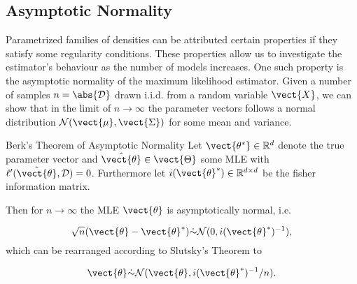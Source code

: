     \subsection{Asymptotic Normality}
        \label{ssec:asymp}
        Parametrized families of densities can be attributed certain properties if they satisfy some regularity conditions.
        These properties allow us to investigate the estimator's behaviour as the number of models increases. 
        One such property is the asymptotic normality of the maximum likelihood estimator.
        Given a number of samples $n = \abs{\mathcal{D}}$ drawn i.i.d. from a random variable $\vect{X}$, we can show that in the limit of $n \rightarrow \infty$ the parameter vectors follows a normal distribution $\mathcal{N}(\vect{\mu}, \vect{\Sigma})$ for some mean and variance.


        \begin{threm}{Berk's Theorem of Asymptotic Normality\cite{berk1972consistency}}
            \label{theorem:berk}
            Let $\vect{\theta^*} \in \mathbb{R}^d$ denote the true parameter vector and $\hat{\vect{\theta}} \in \vect{\Theta}$ some MLE with $\ell'(\hat{\vect{\theta}}, \mathcal{D}) = 0$.
            Furthermore let $i(\vect{\theta}^*) \in \mathbb{R}^{d \times d}$ be the fisher information matrix.

            Then for $n \rightarrow \infty$ the MLE $\vect{\theta}$ is asymptotically normal, i.e.

            \begin{equation}
                \sqrt{n}(\vect{\theta} - \vect{\theta}^*) \dot{\sim} \mathcal{N}(0, i(\vect{\theta}^*)^{-1}),
            \end{equation}
            which can be rearranged according to Slutsky's Theorem\cite{casella2002statistical} to

            \begin{equation}
                \vect{\theta} \dot{\sim} \mathcal{N}(\vect{\theta}, i(\vect{\theta}^*)^{-1}/n).
            \end{equation}
        \end{threm}

